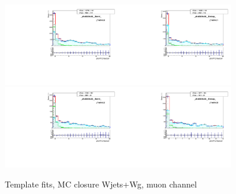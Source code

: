 \begin{figure}[htb]
\begin{center}
   \includegraphics[width=0.45\textwidth]{../figs/figs_v11/MUON_WGamma/MCclosureWjetsPlusWg/c_TEMPL_CHISO_UNblind__phoEt25to30__Barrel__RooFit_MCclosure.pdf}\includegraphics[width=0.45\textwidth]{../figs/figs_v11/MUON_WGamma/MCclosureWjetsPlusWg/c_TEMPL_CHISO_UNblind__phoEt25to30__Endcap__RooFit_MCclosure.pdf}\\
   \includegraphics[width=0.45\textwidth]{../figs/figs_v11/MUON_WGamma/MCclosureWjetsPlusWg/c_TEMPL_CHISO_UNblind__phoEt30to35__Barrel__RooFit_MCclosure.pdf}\includegraphics[width=0.45\textwidth]{../figs/figs_v11/MUON_WGamma/MCclosureWjetsPlusWg/c_TEMPL_CHISO_UNblind__phoEt30to35__Endcap__RooFit_MCclosure.pdf}\\
  \label{fig:templateFits_MCclosureWjetsPlusWg_CHISO_MUON_1}
  \caption{Template fits, MC closure Wjets+Wg, muon channel}
  \end{center}
\end{figure}

